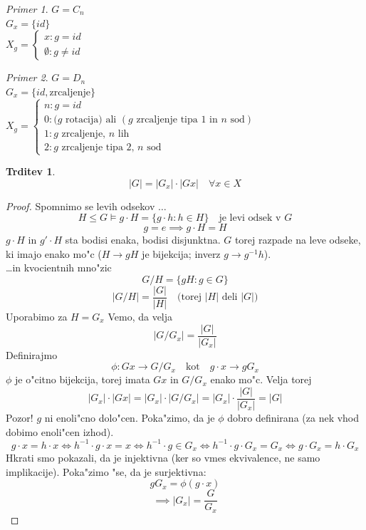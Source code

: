 \documentclass[a4paper,12pt]{article}
\theoremstyle{definition}
\newtheorem{claim}[counter]{Trditev}
\theoremstyle{remark}
\newtheorem*{ex}{Primer}
\begin{document}
\begin{ex}
	$G = C_n$\\
	$G_x = \lbrace id \rbrace$\\
	$X_g = \begin{cases}x: g = id\\\emptyset: g\neq id\end{cases}$
\end{ex}
\begin{ex}
	$G = D_n$\\
	$G_x = \lbrace id, \text{zrcaljenje} \rbrace$\\
	$X_g = \begin{cases}n: g = id\\ 0: (g \text{ rotacija) ali }(g\text{ zrcaljenje tipa 1 in }n\text{ sod}) \\ 1: g \text{ zrcaljenje, }n\text{ lih} \\ 2: g \text{ zrcaljenje tipa 2, }n\text{ sod}\end{cases}$
\end{ex}

\begin{claim}
	$$|G| = |G_x| \cdot |Gx| \quad \forall x \in X$$
\end{claim}
\begin{proof}
	Spomnimo se levih odsekov $\ldots$
	$$ H \leqslant G \models g \cdot H = \lbrace g \cdot h : h \in H \rbrace \quad \text{je levi odsek v }G $$
	$$g = e \implies g \cdot H = H$$
	$g \cdot H$ in $g' \cdot H$ sta bodisi enaka, bodisi disjunktna.
	$G$ torej razpade na leve odseke, ki imajo enako mo"c ($H \rightarrow gH$ je bijekcija; inverz $g \rightarrow g^{-1}h$).
	\\
	\ldots in kvocientnih mno"zic
	$$G/H = \lbrace gH: g \in G \rbrace$$
	$$|G/H| = \frac{|G|}{|H|} \quad \text{(torej } |H| \text{ deli } |G|\text{)} $$
	Uporabimo za $H=G_x$
	Vemo, da velja $$|G/G_x| = \frac{|G|}{|G_x|}$$
	Definirajmo $$\phi: Gx \rightarrow G/G_x \quad \text{kot} \quad g \cdot x \rightarrow gG_x$$
	$\phi$ je o"citno bijekcija, torej imata $Gx$ in $G/G_x$ enako mo"c.
	Velja torej
	$$|G_x|\cdot|Gx| = |G_x| \cdot |G/G_x| = |G_x| \cdot \frac{|G|}{|G_x|} = |G| $$
	Pozor! $g$ ni enoli"cno dolo"cen. Poka"zimo, da je $\phi$ dobro definirana (za nek vhod dobimo enoli"cen izhod).
	$$g \cdot x = h \cdot x \iff h^{-1} \cdot g \cdot x = x \iff h^{-1} \cdot g \in G_x \iff h^{-1} \cdot g \cdot G_x = G_x \iff g \cdot G_x = h \cdot G_x $$
	Hkrati smo pokazali, da je injektivna (ker so vmes ekvivalence, ne samo implikacije).
	Poka"zimo "se, da je surjektivna:
	$$gG_x = \phi (g \cdot x) $$
	$$\implies |G_x| = \frac{G}{G_x}$$
\end{proof}
\end{document}
